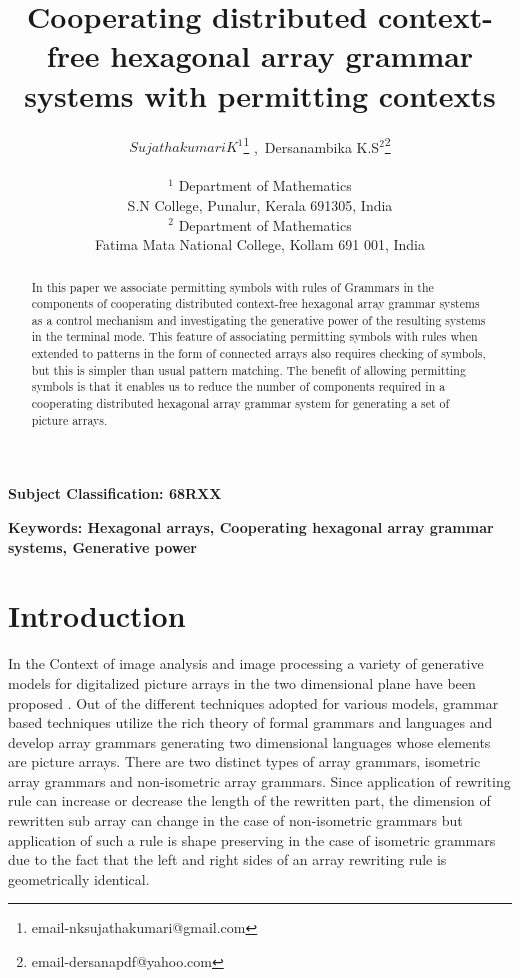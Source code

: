 \documentclass[11pt]{article}
\title{\textbf{ Cooperating distributed context-free hexagonal array grammar systems with permitting contexts }}
\author {$Sujathakumari K^1$\footnote{email-nksujathakumari@gmail.com} ,\ Dersanambika K.S$^2$\footnote{email-dersanapdf@yahoo.com}\\
\date{}
\small{$^1$ Department of Mathematics}\\\small{S.N College,
Punalur, Kerala 691305, India}\\\small{$^2$ Department of
Mathematics}\\\small{Fatima Mata National College, Kollam 691 001,
India}\\}
\begin{document}
\maketitle
\begin{abstract}{In this paper we associate permitting symbols with rules of Grammars in the components of cooperating
 distributed context-free hexagonal array grammar systems as a control mechanism and investigating the generative power
  of the resulting systems in the terminal mode. This feature of associating permitting symbols with rules when extended
   to patterns in the form of connected arrays also requires checking of symbols, but this is simpler than usual pattern
    matching. The benefit of allowing permitting symbols is that it enables us to reduce the number of components required
     in a cooperating distributed hexagonal array grammar system for generating a set of picture arrays.}
\end{abstract}

\noindent\textbf{Subject Classification: 68RXX}

\noindent\textbf{Keywords: Hexagonal arrays, Cooperating hexagonal
array grammar systems, Generative power}
\section{Introduction}
In the Context of image analysis and image processing a variety of
generative models for digitalized picture arrays in the two
dimensional plane have been proposed \cite{10}. Out of the
different techniques adopted for various models, grammar based
techniques utilize the rich theory of formal grammars and
languages and develop array grammars generating two dimensional
languages whose elements are picture arrays. There are two
distinct types of array grammars, isometric array grammars and
non-isometric array grammars. Since application of rewriting rule
can increase or decrease the length of the rewritten part, the
dimension of rewritten sub array can change in the case of
non-isometric grammars but application of such a rule is shape
preserving in the case of isometric grammars due to the fact that
the left and right sides of an array rewriting rule is
geometrically identical.
\end{document}
